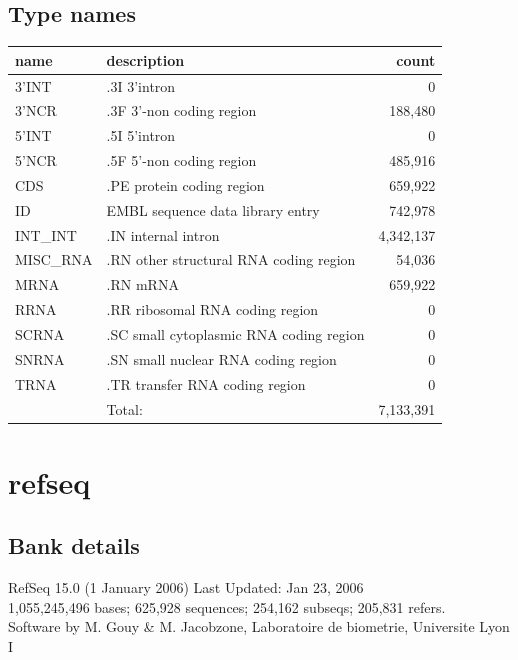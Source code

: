 \documentclass{article}
\begin{document}
\begin{Schunk}
\subsection{Type names}
\noindent\begin{tabular}{llr}
\hline \hline
name & description & count \\
\hline
3'INT  &  .3I 3'intron  &  0 \\
3'NCR  &  .3F  3'-non coding region  &  188,480 \\
5'INT  &  .5I 5'intron  &  0 \\
5'NCR  &  .5F  5'-non coding region  &  485,916 \\
CDS  &  .PE protein coding region  &  659,922 \\
ID  &  EMBL sequence data library entry  &  742,978 \\
INT\_INT  &  .IN  internal intron  &  4,342,137 \\
MISC\_RNA  &  .RN other structural RNA coding region  &  54,036 \\
MRNA  &  .RN mRNA  &  659,922 \\
RRNA  &  .RR ribosomal RNA coding region  &  0 \\
SCRNA  &  .SC small cytoplasmic RNA coding region  &  0 \\
SNRNA  &  .SN small nuclear RNA coding region  &  0 \\
TRNA  &  .TR transfer RNA coding region  &  0 \\
\hline
 & Total: & 7,133,391 \\
\hline \hline
\end{tabular}

\section{ refseq }
\subsection{Bank details}
RefSeq 15.0 (1 January 2006) Last Updated: Jan 23, 2006\\
1,055,245,496 bases; 625,928 sequences; 254,162 subseqs; 205,831 refers.\\
Software by M. Gouy \& M. Jacobzone, Laboratoire de biometrie, Universite Lyon I


\end{Schunk}
\end{document}
